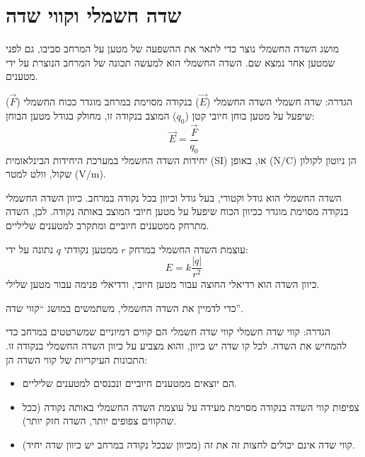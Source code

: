 \documentclass[12pt]{article}
\newcommand{\enquote}[1]{\textquotedblleft #1\textquotedblright}
\begin{document}
\section{שדה חשמלי וקווי שדה}

מושג השדה החשמלי נוצר כדי לתאר את ההשפעה של מטען על המרחב סביבו, גם לפני שמטען אחר נמצא שם. השדה החשמלי הוא למעשה תכונה של המרחב הנוצרת על ידי מטענים.

\begin{definitionBox}{הגדרה: שדה חשמלי}
השדה החשמלי (\(\vec{E}\)) בנקודה מסוימת במרחב מוגדר ככוח החשמלי (\(\vec{F}\)) שיפעל על מטען בוחן חיובי קטן (\(q_0\)) המוצב בנקודה זו, מחולק בגודל מטען הבוחן:
\begin{equation*}
\vec{E} = \frac{\vec{F}}{q_0}
\end{equation*}
יחידות השדה החשמלי במערכת היחידות הבינלאומית (SI) הן ניוטון לקולון (\(\text{N}/\text{C}\)) או, באופן שקול, וולט למטר (\(\text{V}/\text{m}\)).
\end{definitionBox}

השדה החשמלי הוא גודל וקטורי, בעל גודל וכיוון בכל נקודה במרחב. כיוון השדה החשמלי בנקודה מסוימת מוגדר ככיוון הכוח שיפעל על מטען חיובי המוצב באותה נקודה. לכן, השדה מתרחק ממטענים חיוביים ומתקרב למטענים שליליים.

עוצמת השדה החשמלי במרחק \(r\) ממטען נקודתי \(q\) נתונה על ידי:
\begin{equation*}
E = k \frac{|q|}{r^2}
\end{equation*}
כיוון השדה הוא רדיאלי החוצה עבור מטען חיובי, ורדיאלי פנימה עבור מטען שלילי.

כדי לדמיין את השדה החשמלי, משתמשים במושג \enquote{קווי שדה}.

\begin{definitionBox}{הגדרה: קווי שדה חשמלי}
קווי שדה חשמלי הם קווים דמיוניים שמשרטטים במרחב כדי להמחיש את השדה. לכל קו שדה יש כיוון, והוא מצביע על כיוון השדה החשמלי בנקודה זו. התכונות העיקריות של קווי השדה הן:
\begin{itemize}
    \item הם יוצאים ממטענים חיוביים ונכנסים למטענים שליליים.
    \item צפיפות קווי השדה בנקודה מסוימת מעידה על עוצמת השדה החשמלי באותה נקודה (ככל שהקווים צפופים יותר, השדה חזק יותר).
    \item קווי שדה אינם יכולים לחצות זה את זה (מכיוון שבכל נקודה במרחב יש כיוון שדה יחיד).
\end{itemize}
\end{definitionBox}
\end{document}

